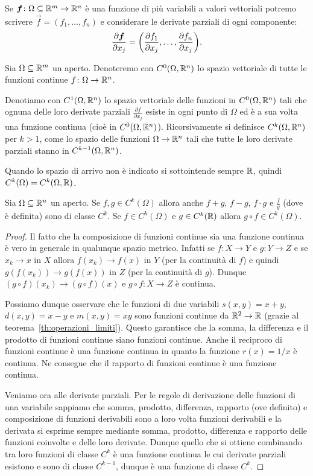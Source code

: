 Se $\boldsymbol f\colon \Omega \subseteq {\mathbb R}^m \to {\mathbb R}^n$ è una funzione di più
variabili a valori vettoriali potremo scrivere $\vec f = (f_1, \dots, f_n)$
e considerare le derivate parziali di ogni componente:
\[
  \frac{\partial \boldsymbol f}{\partial x_j}
  = {\left( \frac{\partial f_1}{\partial x_j}, \dots, \frac{\partial f_n}{\partial x_j} \right)}.
\]

\begin{definition}
Sia $\Omega\subseteq {\mathbb R}^m$ un aperto. Denoteremo con $C^0(\Omega,{\mathbb R}^n)$
lo spazio vettoriale di tutte le funzioni
continue $f\colon \Omega \to {\mathbb R}^n$.

Denotiamo con $C^1(\Omega,{\mathbb R}^n)$ lo spazio vettoriale
delle funzioni in $C^0(\Omega,{\mathbb R}^n)$ tali che ognuna delle loro derivate
parziali $\frac{\partial f}{\partial x_j}$ esiste in ogni punto di $\Omega$ ed
è a sua volta una funzione continua (cioè in $C^0(\Omega,{\mathbb R}^n)$).
Ricorsivamente si definisce $C^k(\Omega,{\mathbb R}^n)$ per $k>1$,
come lo spazio delle funzioni $\Omega\to{\mathbb R}^n$ tali che tutte le loro derivate
parziali stanno in $C^{k-1}(\Omega,{\mathbb R}^n)$.

Quando lo spazio di arrivo non è indicato si sottointende sempre ${\mathbb R}$, quindi
$C^k(\Omega) = C^k(\Omega,{\mathbb R})$.
\end{definition}

\begin{theorem}
Sia $\Omega \subseteq {\mathbb R}^n$ un aperto.
Se $f,g\in C^k(\Omega)$ allora anche $f+g$, $f-g$, $f\cdot g$ e $\frac{f}{g}$
(dove è definita) sono di classe $C^k$. Se $f\in C^k(\Omega)$ e $g\in C^k({\mathbb R})$
allora $g\circ f \in C^k(\Omega)$.
\end{theorem}
%
\begin{proof}
Il fatto che la composizione di funzioni continue sia una funzione continua
è vero in generale in qualunque spazio metrico.
Infatti se $f\colon X\to Y$ e $g\colon Y \to Z$ e se $x_k\to x$ in $X$
allora $f(x_k) \to f(x)$ in $Y$ (per la continuità di $f$)
e quindi $g(f(x_k)) \to g(f(x))$ in $Z$ (per la continuità di $g$).
Dunque $(g \circ f)(x_k) \to (g\circ f)(x)$ e $g\circ f\colon X\to Z$ è continua.

Possiamo dunque osservare che le funzioni di due variabili $s(x,y) = x+y$,
$d(x,y)=x-y$ e
$m(x,y)=xy$ sono funzioni continue da ${\mathbb R}^2\to {\mathbb R}$ 
(grazie al teorema~\ref{th:operazioni_limiti}). 
Questo garantisce
che la somma, la differenza e il prodotto di funzioni continue siano funzioni continue.
Anche il reciproco di funzioni continue è una funzione continua
in quanto la funzione $r(x)=1/x$ è continua.
Ne consegue che il rapporto di funzioni continue è una
funzione continua.

Veniamo ora alle derivate parziali.
Per le regole di derivazione delle funzioni di una variabile sappiamo che
somma, prodotto, differenza, rapporto (ove definito) e composizione
di funzioni derivabili sono
a loro volta funzioni derivabili e la derivata si esprime sempre mediante
somma, prodotto, differenza e rapporto delle funzioni coinvolte e delle loro
derivate. Dunque quello che si ottiene combinando tra loro funzioni
di classe $C^k$ è una funzione continua le cui derivate parziali esistono e
sono di classe $C^{k-1}$, dunque è una funzione di classe $C^k$.
\end{proof}

